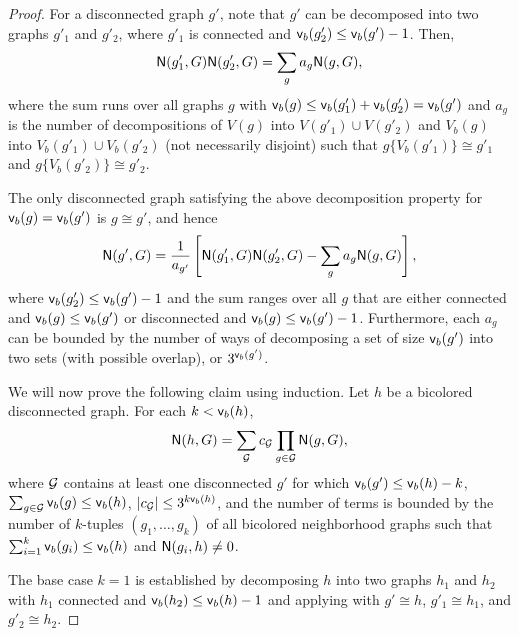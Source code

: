 \begin{proof}
For a disconnected graph $ g' $, note that $ g' $ can be decomposed into two graphs $ g'_1 $ and $ g'_2 $, where $ g'_1 $ is connected and $ {\mathsf{v}}_b(g'_2) \leq {\mathsf{v}}_b(g') - 1 $. Then,
\begin{equation}
{\mathsf{N}}(g'_1, G){\mathsf{N}}(g'_2, G) = \sum_{g} a_g{\mathsf{N}}(g, G),
\end{equation}
where the sum runs over all graphs $ g $ with $ {\mathsf{v}}_b(g) \leq {\mathsf{v}}_b(g'_1) + {\mathsf{v}}_b(g'_2) = {\mathsf{v}}_b(g') $ and $ a_g $ is the number of decompositions of $ V(g) $ into $ V(g'_1) \cup V(g'_2) $ and $ V_b(g) $ into $ V_b(g'_1) \cup V_b(g'_2) $ (not necessarily disjoint) such that $ g\{ V_b(g'_1) \} \cong g'_1 $ and $ g\{ V_b(g'_2) \} \cong g'_2 $.


The only disconnected graph satisfying the above decomposition property for $ {\mathsf{v}}_b(g) = {\mathsf{v}}_b(g') $ is $ g \cong g' $, and hence
\begin{equation} \label{eq:base}
{\mathsf{N}}(g', G) =  \frac{1}{a_{g'}}\left[{\mathsf{N}}(g'_1, G){\mathsf{N}}(g'_2, G) - \sum_{g} a_g{\mathsf{N}}(g, G) \right],
\end{equation}
where $ {\mathsf{v}}_b(g'_2) \leq {\mathsf{v}}_b(g')-1 $ and the sum ranges over all $ g $ that are either connected and $ {\mathsf{v}}_b(g) \leq {\mathsf{v}}_b(g') $ or disconnected and $ {\mathsf{v}}_b(g) \leq {\mathsf{v}}_b(g')-1 $. Furthermore, each $ a_g $ can be bounded by the number of ways of decomposing a set of size $ {\mathsf{v}}_b(g') $ into two sets (with possible overlap), or $ 3^{{\mathsf{v}}_b(g')} $.

We will now prove the following claim using induction.
Let $ h $ be a bicolored disconnected graph. For each $ k < {\mathsf{v}}_b(h) $,
\begin{equation} \label{eq:poly-rep1}
{\mathsf{N}}(h, G) = \sum_{{\mathcal{G}}}c_{{\mathcal{G}}}\prod_{g\in{\mathcal{G}}}{\mathsf{N}}(g, G),
\end{equation}
where $ {\mathcal{G}} $ contains at least one disconnected $ g' $ for which $ {\mathsf{v}}_b(g') \leq {\mathsf{v}}_b(h)-k $, $ \sum_{g\in {\mathcal{G}}} {\mathsf{v}}_b(g) \leq {\mathsf{v}}_b(h) $, $ |c_{{\mathcal{G}}}| \leq 3^{k{\mathsf{v}}_b(h)} $, and the number of terms is bounded by the number of $ k $-tuples $ (g_1, \dots, g_k) $ of all bicolored neighborhood graphs such that $ \sum_{i=1}^{k} {\mathsf{v}}_b(g_i) \leq {\mathsf{v}}_b(h) $ and $ {\mathsf{N}}(g_i, h) \neq 0 $.

The base case $ k = 1$ is established by decomposing $ h $ into two graphs $ h_1 $ and $ h_2 $ with $ h_1 $ connected and $ {\mathsf{v}}_b(h_2) \leq {\mathsf{v}}_b(h) - 1 $ and applying  with $ g' \cong h $, $ g'_1 \cong h_1 $, and $ g'_2 \cong h_2 $.


\end{proof}
